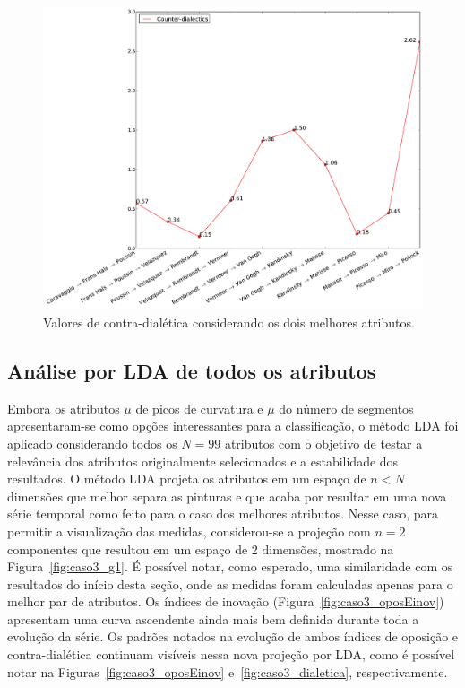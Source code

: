 \begin{figure}[h!]
\begin{center}
        \includegraphics[width=\columnwidth]{figs/caso1_dialetica}
    \caption{Valores de contra-dialética considerando os dois melhores atributos.}
        \label{fig:caso1_dialetica}
\end{center}
\end{figure}

\subsection{Análise por LDA de todos os atributos}
\label{subsec:lda}

Embora os atributos $\mu$ de picos de curvatura e $\mu$ do número de
segmentos apresentaram-se como opções interessantes para a
classificação, o método LDA foi aplicado considerando todos os $N =
99$ atributos com o objetivo de testar a relevância dos atributos
originalmente selecionados e a estabilidade dos resultados. O método
LDA projeta os atributos em um espaço de $n < N$ dimensões que melhor
separa as pinturas e que acaba por resultar em uma nova série temporal
como feito para o caso dos melhores atributos. Nesse caso, para
permitir a visualização das medidas, considerou-se a projeção com $n =
2$ componentes que resultou em um espaço de 2 dimensões, mostrado na
Figura~\ref{fig:caso3_g1}. É possível notar, como esperado, uma
similaridade com os resultados do início desta seção, onde as medidas
foram calculadas apenas para o melhor par de atributos. Os índices de
inovação (Figura~\ref{fig:caso3_oposEinov}) apresentam uma curva
ascendente ainda mais bem definida durante toda a evolução da
série. Os padrões notados na evolução de ambos índices de oposição e
contra-dialética continuam visíveis nessa nova projeção por LDA, como
é possível notar na Figuras~\ref{fig:caso3_oposEinov}
e~\ref{fig:caso3_dialetica}, respectivamente.

